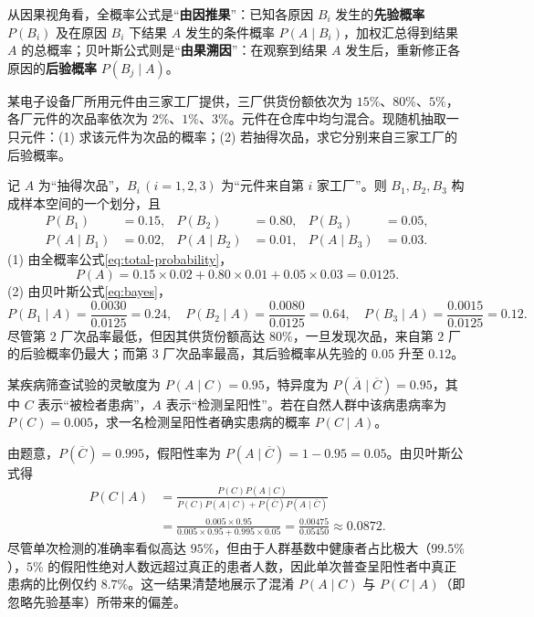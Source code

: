 
从因果视角看，全概率公式是“\textbf{由因推果}”：已知各原因 $B_i$ 发生的\textbf{先验概率} $P(B_i)$ 及在原因 $B_i$ 下结果 $A$ 发生的条件概率 $P(A\mid B_i)$，加权汇总得到结果 $A$ 的总概率；贝叶斯公式则是“\textbf{由果溯因}”：在观察到结果 $A$ 发生后，重新修正各原因的\textbf{后验概率} $P(B_j\mid A)$。

\begin{example}[title={三厂供货的次品率与溯源}]
\label{eg:bayes-factory}
某电子设备厂所用元件由三家工厂提供，三厂供货份额依次为 $15\%$、$80\%$、$5\%$，各厂元件的次品率依次为 $2\%$、$1\%$、$3\%$。元件在仓库中均匀混合。现随机抽取一只元件：(1) 求该元件为次品的概率；(2) 若抽得次品，求它分别来自三家工厂的后验概率。
\begin{solution}
记 $A$ 为“抽得次品”，$B_i\,(i=1,2,3)$ 为“元件来自第 $i$ 家工厂”。则 $B_1,B_2,B_3$ 构成样本空间的一个划分，且
\[
\begin{aligned}
  P(B_1)&=0.15,& P(B_2)&=0.80,& P(B_3)&=0.05,\\
  P(A\mid B_1)&=0.02,& P(A\mid B_2)&=0.01,& P(A\mid B_3)&=0.03.
\end{aligned}
\]
(1) 由全概率公式\eqref{eq:total-probability}，
\[
  P(A)=0.15\times 0.02+0.80\times 0.01+0.05\times 0.03=0.0125.
\]
(2) 由贝叶斯公式\eqref{eq:bayes}，
\[
  P(B_1\mid A)=\frac{0.0030}{0.0125}=0.24,\quad
  P(B_2\mid A)=\frac{0.0080}{0.0125}=0.64,\quad
  P(B_3\mid A)=\frac{0.0015}{0.0125}=0.12.
\]
尽管第 $2$ 厂次品率最低，但因其供货份额高达 $80\%$，一旦发现次品，来自第 $2$ 厂的后验概率仍最大；而第 $3$ 厂次品率最高，其后验概率从先验的 $0.05$ 升至 $0.12$。
\end{solution}
\end{example}

\begin{example}[title={疾病普查中的后验概率}]
\label{eg:bayes-screening}
某疾病筛查试验的灵敏度为 $P(A\mid C)=0.95$，特异度为 $P(\overline{A}\mid\overline{C})=0.95$，其中 $C$ 表示“被检者患病”，$A$ 表示“检测呈阳性”。若在自然人群中该病患病率为 $P(C)=0.005$，求一名检测呈阳性者确实患病的概率 $P(C\mid A)$。
\begin{solution}
由题意，$P(\overline{C})=0.995$，假阳性率为 $P(A\mid\overline{C})=1-0.95=0.05$。由贝叶斯公式得
\[
\begin{aligned}
  P(C\mid A)
  &=\frac{P(C)P(A\mid C)}{P(C)P(A\mid C)+P(\overline{C})P(A\mid\overline{C})}\\
  &=\frac{0.005\times 0.95}{0.005\times 0.95+0.995\times 0.05}
  =\frac{0.00475}{0.05450}\approx 0.0872.
\end{aligned}
\]
尽管单次检测的准确率看似高达 $95\%$，但由于人群基数中健康者占比极大（$99.5\%$），$5\%$ 的假阳性绝对人数远超过真正的患者人数，因此单次普查呈阳性者中真正患病的比例仅约 $8.7\%$。这一结果清楚地展示了混淆 $P(A\mid C)$ 与 $P(C\mid A)$（即忽略先验基率）所带来的偏差。
\end{solution}
\end{example}

